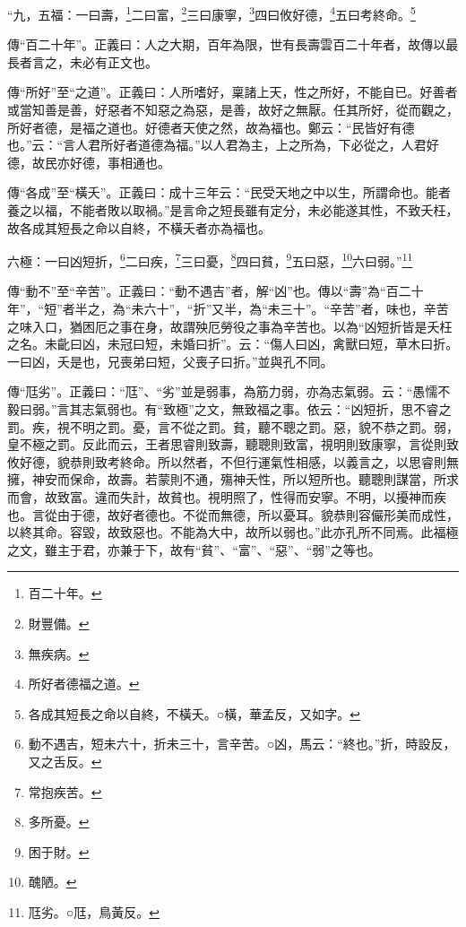 “九，五福：一曰壽，\footnote{百二十年。}二曰富，\footnote{財豐備。}三曰康寧，\footnote{無疾病。}四曰攸好德，\footnote{所好者德福之道。}五曰考終命。\footnote{各成其短長之命以自終，不橫夭。○橫，華孟反，又如字。}


{\noindent\zhuan{}\fzbyks 傳“百二十年”。正義曰：人之大期，百年為限，世有長壽雲百二十年者，故傳以最長者言之，未必有正文也。 \par}

{\noindent\zhuan{}\fzbyks 傳“所好”至“之道”。正義曰：人所嗜好，稟諸上天，性之所好，不能自已。好善者或當知善是善，好惡者不知惡之為惡，是善，故好之無厭。任其所好，從而觀之，所好者德，是福之道也。好德者天使之然，故為福也。鄭云：“民皆好有德也。”云：“言人君所好者道德為福。”以人君為主，上之所為，下必從之，人君好德，故民亦好德，事相通也。 \par}

{\noindent\zhuan{}\fzbyks 傳“各成”至“橫夭”。正義曰：成十三年云：“民受天地之中以生，所謂命也。能者養之以福，不能者敗以取禍。”是言命之短長雖有定分，未必能遂其性，不致夭枉，故各成其短長之命以自終，不橫夭者亦為福也。 \par}

六極：一曰凶短折，\footnote{動不遇吉，短未六十，折未三十，言辛苦。○凶，馬云：“終也。”折，時設反，又之舌反。}二曰疾，\footnote{常抱疾苦。}三曰憂，\footnote{多所憂。}四曰貧，\footnote{困于財。}五曰惡，\footnote{醜陋。}六曰弱。”\footnote{尫劣。○尫，鳥黃反。}

{\noindent\zhuan{}\fzbyks 傳“動不”至“辛苦”。正義曰：“動不遇吉”者，解“凶”也。傳以“壽”為“百二十年”，“短”者半之，為“未六十”，“折”又半，為“未三十”。“辛苦”者，味也，辛苦之味入口，猶困厄之事在身，故謂殃厄勞役之事為辛苦也。以為“凶短折皆是夭枉之名。未齔曰凶，未冠曰短，未婚曰折”。云：“傷人曰凶，禽獸曰短，草木曰折。一曰凶，夭是也，兄喪弟曰短，父喪子曰折。”並與孔不同。 \par}

{\noindent\zhuan{}\fzbyks 傳“尫劣”。正義曰：“尫”、“劣”並是弱事，為筋力弱，亦為志氣弱。云：“愚懦不毅曰弱。”言其志氣弱也。有“致極”之文，無致福之事。依云：“凶短折，思不睿之罰。疾，視不明之罰。憂，言不從之罰。貧，聽不聰之罰。惡，貌不恭之罰。弱，皇不極之罰。反此而云，王者思睿則致壽，聽聰則致富，視明則致康寧，言從則致攸好德，貌恭則致考終命。所以然者，不但行運氣性相感，以義言之，以思睿則無擁，神安而保命，故壽。若蒙則不通，殤神夭性，所以短所也。聽聰則謀當，所求而會，故致富。違而失計，故貧也。視明照了，性得而安寧。不明，以擾神而疾也。言從由于德，故好者德也。不從而無德，所以憂耳。貌恭則容儼形美而成性，以終其命。容毀，故致惡也。不能為大中，故所以弱也。”此亦孔所不同焉。此福極之文，雖主于君，亦兼于下，故有“貧”、“富”、“惡”、“弱”之等也。 \par}

